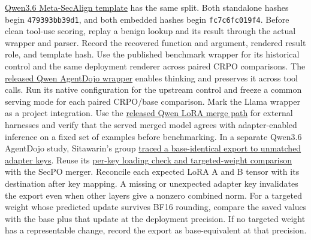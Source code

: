 \documentclass[11pt]{article}
\begin{document}
\begin{itemize}
\href{https://huggingface.co/Sizhe-Chen/Qwen3.6-27B-Instruct-MetaSecAlign/blob/d850ad5cda5155e291af5e091b67bb5f6c7f233f/chat_template.jinja}{Qwen3.6 Meta-SecAlign template} has the same split. Both standalone hashes begin \texttt{479393bb39d1}, and both embedded hashes begin \texttt{fc7c6fc019f4}. Before clean tool-use scoring, replay a benign lookup and its result through the actual wrapper and parser. Record the recovered function and argument, rendered result role, and template hash. Use the published benchmark wrapper for its historical control and the same deployment renderer across paired CRPO comparisons. The \href{https://github.com/Sizhe-Chen/SecPO/blob/da0372a0e598badf4e51c98c175a962147cac2ac/src/secpo/evaluation/agentdojo_models.py}{released Qwen AgentDojo wrapper} enables thinking and preserves it across tool calls. Run its native configuration for the upstream control and freeze a common serving mode for each paired CRPO/base comparison. Mark the Llama wrapper as a project integration. Use the \href{https://github.com/Sizhe-Chen/SecPO/blob/da0372a0e598badf4e51c98c175a962147cac2ac/scripts/merge_qwen36_27b_lora.py}{released Qwen LoRA merge path} for external harnesses and verify that the served merged model agrees with adapter-enabled inference on a fixed set of examples before benchmarking. In a separate Qwen3.6 AgentDojo study, Sitawarin's group \href{https://github.com/chawins/agentdojo/blob/07e5ed5d6039571eb7b5bda683143ebd2666e1b7/runs/SUMMARY.md}{traced a base-identical export to unmatched adapter keys}. Reuse its \href{https://github.com/chawins/agentdojo/blob/07e5ed5d6039571eb7b5bda683143ebd2666e1b7/scripts/qwen3_6_eval/merge_lora.py#L248-L283}{per-key loading check and targeted-weight comparison} with the SecPO merger. Reconcile each expected LoRA A and B tensor with its destination after key mapping. A missing or unexpected adapter key invalidates the export even when other layers give a nonzero combined norm. For a targeted weight whose predicted update survives BF16 rounding, compare the saved values with the base plus that update at the deployment precision. If no targeted weight has a representable change, record the export as base-equivalent at that precision.

\end{itemize}
\end{document}
